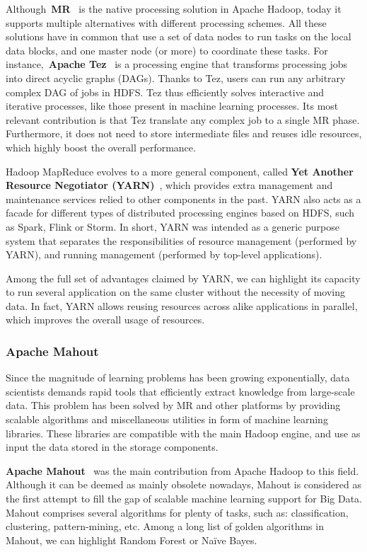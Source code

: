 \documentclass[3p,review]{elsarticle}
\begin{document}
	Although~\textbf{MR}~\cite{dean04} is the native processing solution in Apache Hadoop, today it supports multiple alternatives with different processing schemes. All these solutions have in common that use a set of data nodes to run tasks on the local data blocks, and one master node (or more) to coordinate these tasks. For instance,~\textbf{Apache Tez}~\cite{tez} is a processing engine that transforms processing jobs into direct acyclic graphs (DAGs). Thanks to Tez, users can run any arbitrary complex DAG of jobs in HDFS. Tez thus efficiently solves interactive and iterative processes, like those present in machine learning processes. Its most relevant contribution is that Tez translate any complex job to a single MR phase. Furthermore, it does not need to store intermediate files and reuses idle resources, which highly boost the overall performance.
	
	Hadoop MapReduce evolves to a more general component, called \textbf{Yet Another Resource Negotiator (YARN)}~\cite{yarn}, which provides extra management and maintenance services relied to other components in the past. YARN also acts as a facade for different types of distributed processing engines based on HDFS, such as Spark, Flink or Storm. In short, YARN was intended as a generic purpose system that separates the responsibilities of resource management (performed by YARN), and running management (performed by top-level applications).
	
	Among the full set of advantages claimed by YARN, we can highlight its capacity to run several application on the same cluster without the necessity of moving data. In fact, YARN allows reusing resources across alike applications in parallel, which improves the overall usage of resources.
	
	\subsubsection{Apache Mahout}
	
	Since the magnitude of learning problems has been growing exponentially, data scientists demands rapid tools that efficiently extract knowledge from large-scale data. This problem has been solved by MR and other platforms by providing scalable algorithms and miscellaneous utilities in form of machine learning libraries. These libraries are compatible with the main Hadoop engine, and use as input the data stored in the storage components. 
	
	\textbf{Apache Mahout}~\cite{mahout} was the main contribution from Apache Hadoop to this field. Although it can be deemed as mainly obsolete nowadays, Mahout is considered as the first attempt to fill the gap of scalable machine learning support for Big Data. Mahout comprises several algorithms for plenty of tasks, such as: classification, clustering, pattern-mining, etc. Among a long list of golden algorithms in Mahout, we can highlight Random Forest or Na\"ive Bayes. 
	
\end{document}
